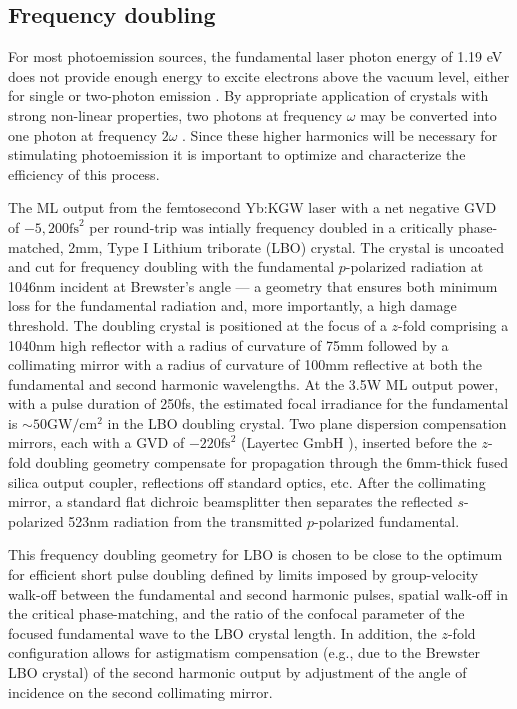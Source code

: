 \subsection{Frequency doubling}

For most photoemission sources, the fundamental laser photon energy of 1.19 eV does not provide enough energy to excite electrons above the vacuum level, either for single or two-photon emission \cite{eastman_photoelectric_1970,johnson_optical_1972,dowell_quantum_2009}.
By appropriate application of crystals with strong non-linear properties, two photons at frequency $\omega$ may be converted into one photon at frequency $2 \omega$ \cite{shen_principles_2002}.
Since these higher harmonics will be necessary for stimulating photoemission it is important to optimize and characterize the efficiency of this process.

The ML output from the femtosecond Yb:KGW laser with a net negative GVD of $-5,200\text{fs}^2$ per round-trip was intially frequency doubled in a critically phase-matched, 2mm, Type I Lithium triborate (LBO) crystal.
The crystal is uncoated and cut for frequency doubling with the fundamental $p$-polarized radiation at 1046nm incident at Brewster's angle --- a geometry that ensures both minimum loss for the fundamental radiation and, more importantly, a high damage threshold.
The doubling crystal is positioned at the focus of a $z$-fold comprising a 1040nm high reflector with a radius of curvature of 75mm followed by a collimating mirror with a radius of curvature of 100mm reflective at both the fundamental and second harmonic wavelengths.
At the 3.5W ML output power, with a pulse duration of 250fs, the estimated focal irradiance for the fundamental is $\sim50\text{GW}/\text{cm}^2$ in the LBO doubling crystal.
Two plane dispersion compensation mirrors, each with a GVD of $-220\text{fs}^2$ (Layertec GmbH \cite{website_layertec}), inserted before the $z$-fold doubling geometry compensate for propagation through the 6mm-thick fused silica output coupler, reflections off standard optics, etc.
After the collimating
mirror, a standard flat dichroic beamsplitter then separates the reflected $s$-polarized 523nm radiation from the transmitted $p$-polarized fundamental.

This frequency doubling geometry for LBO is chosen to be close to the optimum for efficient short pulse doubling \cite{wang_efficiency_2003,Saltiel_second_harmonic_2004} defined by limits imposed by group-velocity walk-off between the fundamental and second harmonic pulses, spatial walk-off in the critical phase-matching, and the ratio of the confocal parameter of the focused fundamental wave to the LBO crystal length.
In addition, the $z$-fold configuration allows for astigmatism compensation (e.g., due to the Brewster LBO crystal) of the second harmonic output by adjustment of the angle of incidence on the second collimating mirror.

